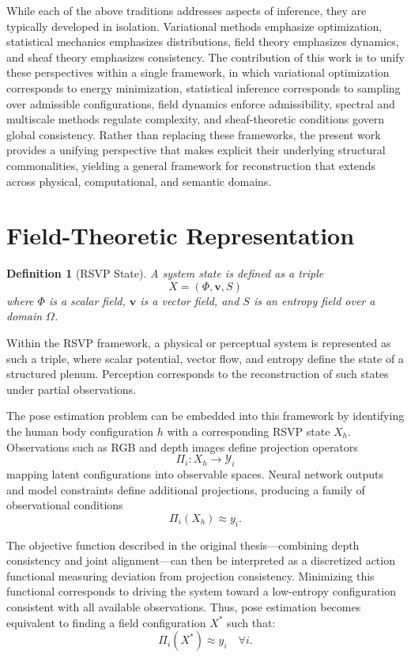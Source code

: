 \documentclass[12pt]{article}
\newtheorem{definition}{Definition}
\begin{document}
While each of the above traditions addresses aspects of inference, they are typically developed in isolation. Variational methods emphasize optimization, statistical mechanics emphasizes distributions, field theory emphasizes dynamics, and sheaf theory emphasizes consistency. The contribution of this work is to unify these perspectives within a single framework, in which variational optimization corresponds to energy minimization, statistical inference corresponds to sampling over admissible configurations, field dynamics enforce admissibility, spectral and multiscale methods regulate complexity, and sheaf-theoretic conditions govern global consistency. Rather than replacing these frameworks, the present work provides a unifying perspective that makes explicit their underlying structural commonalities, yielding a general framework for reconstruction that extends across physical, computational, and semantic domains.

\section{Field-Theoretic Representation}

\begin{definition}[RSVP State]
A system state is defined as a triple
\[
X = (\Phi, \mathbf{v}, S)
\]
where $\Phi$ is a scalar field, $\mathbf{v}$ is a vector field, and $S$ is an entropy field over a domain $\Omega$.
\end{definition}

Within the RSVP framework, a physical or perceptual system is represented as such a triple, where scalar potential, vector flow, and entropy define the state of a structured plenum. Perception corresponds to the reconstruction of such states under partial observations.

The pose estimation problem can be embedded into this framework by identifying the human body configuration $h$ with a corresponding RSVP state $X_h$. Observations such as RGB and depth images define projection operators
\[
\Pi_i : X_h \to \mathcal{Y}_i
\]
mapping latent configurations into observable spaces. Neural network outputs and model constraints define additional projections, producing a family of observational conditions
\[
\Pi_i(X_h) \approx y_i.
\]

The objective function described in the original thesis---combining depth consistency and joint alignment---can then be interpreted as a discretized action functional measuring deviation from projection consistency. Minimizing this functional corresponds to driving the system toward a low-entropy configuration consistent with all available observations. Thus, pose estimation becomes equivalent to finding a field configuration $X^*$ such that:
\[
\Pi_i(X^*) \approx y_i \quad \forall i.
\]
\end{document}
